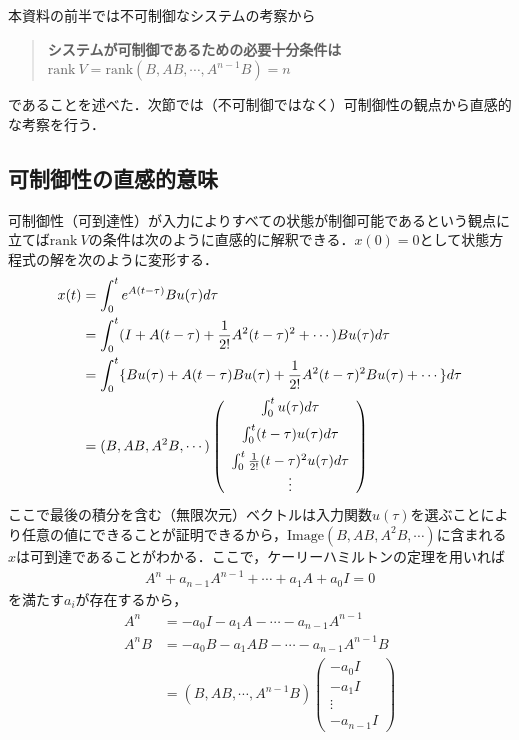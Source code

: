 本資料の前半では不可制御なシステムの考察から
\begin{quote}
{\bf システムが可制御であるための必要十分条件は\\
$\mbox{rank}\ V = \mbox{rank} (B,AB,\cdots,A^{n-1}B) = n$}
\end{quote}
であることを述べた．次節では（不可制御ではなく）可制御性の観点から直感的な考察を行う．



\subsection{可制御性の直感的意味}

可制御性（可到達性）が入力によりすべての状態が制御可能であるという観点に立てば$\mbox{rank}\ V$の条件は次のように直感的に解釈できる．$x(0)=0$として状態方程式の解を次のように変形する．
\begin{align}
 x(t) &= \int_0^t e^{A(t-\tau)} B u(\tau) d \tau
\nonumber \\
 &= \int_0^t (I + A(t-\tau) + {1 \over 2!} A^2 (t-\tau)^2 + \cdots) B u(\tau) d\tau
\nonumber \\
 &= \int_0^t \{ B u(\tau) + A(t-\tau) B u(\tau) 
          + {1 \over 2!} A^2 (t-\tau)^2 B u(\tau) + \cdots \}  d\tau
\nonumber \\
 &= (B, AB, A^2 B, \cdots)
     \left( 
        \begin{array}{c}
            \int_0^t u(\tau) d\tau \\[2mm]
            \int_0^t (t-\tau) u(\tau) d\tau \\[2mm]
            \int_0^t {1 \over 2!} (t-\tau)^2 u(\tau) d\tau \\
            \vdots
        \end{array}
     \right)
\end{align}
ここで最後の積分を含む（無限次元）ベクトルは入力関数$u(\tau)$を選ぶことにより任意の値にできることが証明できるから，$\mbox{Image} (B, AB, A^2B, \cdots)$に含まれる$x$は可到達であることがわかる．ここで，ケーリーハミルトンの定理を用いれば
\begin{align}
	A^n + a_{n-1} A^{n-1} + \cdots + a_1 A + a_0 I = 0
\end{align}
を満たす$a_i$が存在するから，
\begin{align}
	A^n &= - a_0 I  - a_1 A - \cdots - a_{n-1} A^{n-1}
\\
	A^n B &= - a_0 B  - a_1 A B - \cdots - a_{n-1} A^{n-1} B
\nonumber \\
		&= (B, A B, \cdots, A^{n-1} B )
		   \left( \begin{array}{c} - a_{0} I \\ 
					- a_{1} I \\ 
					\vdots \\
					- a_{n-1} I \end{array} \right)
\end{align}
